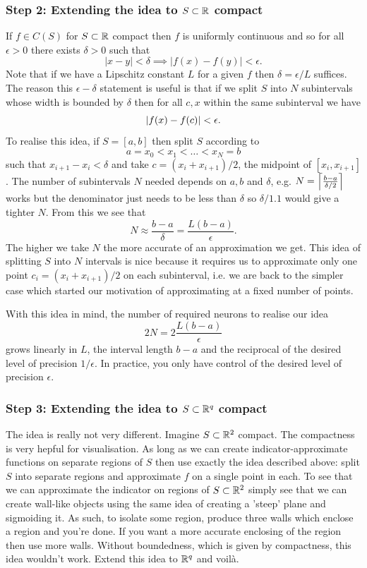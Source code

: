 \documentclass[11pt]{article}
\begin{document}
\subsubsection*{Step 2: Extending the idea to $S\subset\mathbb{R}$ compact}
If $f\in C(S)$ for $S\subset\mathbb{R}$ compact then $f$ is uniformly continuous and so for all $\epsilon>0$ there exists $\delta>0$ such that
$$
|x-y|<\delta\implies|f(x)-f(y)|<\epsilon.
$$
Note that if we have a Lipschitz constant $L$ for a given $f$ then $\delta=\epsilon/L$ suffices. The reason this $\epsilon-\delta$ statement is useful is that if we split $S$ into $N$ subintervals whose width is bounded by $\delta$ then for all $c,x$ within the same subinterval we have
$$
\left|f(x)-f(c)\right|<\epsilon.
$$
To realise this idea, if $S=[a,b]$ then split $S$ according to
$$
a=x_0<x_1<\dots<x_N=b
$$
such that $x_{i+1}-x_i<\delta$ and take $c=(x_i+x_{i+1})/2$, the midpoint of $[x_i,x_{i+1}]$. The number of subintervals $N$ needed depends on $a,b$ and $\delta$, e.g. $N=\left\lceil\frac{b-a}{\delta/2}\right\rceil$ works but the denominator just needs to be less than $\delta$ so $\delta/1.1$ would give a tighter $N$. From this we see that
$$
N
\approx
\frac{b-a}{\delta}
=
\frac{L(b-a)}{\epsilon}.
$$
The higher we take $N$ the more accurate of an approximation we get. This idea of splitting $S$ into $N$ intervals is nice because it requires us to approximate only one point $c_i=(x_i+x_{i+1})/2$ on each subinterval, i.e. we are back to the simpler case which started our motivation of approximating at a fixed number of points.

With this idea in mind, the number of required neurons to realise our idea
$$
2N
=
2\frac{L(b-a)}{\epsilon}
$$
grows linearly in $L$, the interval length $b-a$ and the reciprocal of the desired level of precision $1/\epsilon$. In practice, you only have control of the desired level of precision $\epsilon$.

\subsubsection*{Step 3: Extending the idea to $S\subset\mathbb{R}^q$ compact}
The idea is really not very different. Imagine $S\subset\mathbb{R}^2$ compact. The compactness is very hepful for visualisation. As long as we can create indicator-approximate functions on separate regions of $S$ then use exactly the idea described above: split $S$ into separate regions and approximate $f$ on a single point in each. To see that we can approximate the indicator on regions of $S\subset\mathbb{R}^2$ simply see that we can create wall-like objects using the same idea of creating a 'steep' plane and sigmoiding it. As such, to isolate some region, produce three walls which enclose a region and you're done. If you want a more accurate enclosing of the region then use more walls. Without boundedness, which is given by compactness, this idea wouldn't work. Extend this idea to $\mathbb{R}^q$ and voilà.
\end{document}

